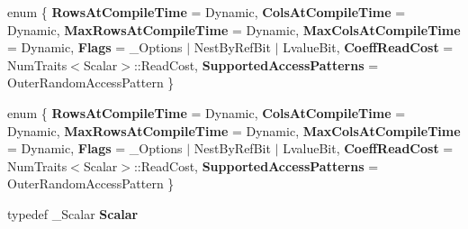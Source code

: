 \begin{DoxyCompactItemize}
\item 
\mbox{\label{struct_eigen_1_1internal_1_1traits_3_01_dynamic_sparse_matrix_3_01___scalar_00_01___options_00_01___storage_index_01_4_01_4_a776f5615686c280cbdfa6ea72b9144d2}} 
enum \{ \newline
{\bfseries Rows\+At\+Compile\+Time} = Dynamic, 
{\bfseries Cols\+At\+Compile\+Time} = Dynamic, 
{\bfseries Max\+Rows\+At\+Compile\+Time} = Dynamic, 
{\bfseries Max\+Cols\+At\+Compile\+Time} = Dynamic, 
\newline
{\bfseries Flags} = \+\_\+\+Options $\vert$ Nest\+By\+Ref\+Bit $\vert$ Lvalue\+Bit, 
{\bfseries Coeff\+Read\+Cost} = Num\+Traits$<$Scalar$>$\+:\+:Read\+Cost, 
{\bfseries Supported\+Access\+Patterns} = Outer\+Random\+Access\+Pattern
 \}
\item 
\mbox{\label{struct_eigen_1_1internal_1_1traits_3_01_dynamic_sparse_matrix_3_01___scalar_00_01___options_00_01___storage_index_01_4_01_4_a7a53718df49f5cbea4ab2f8ccf69bdc7}} 
enum \{ \newline
{\bfseries Rows\+At\+Compile\+Time} = Dynamic, 
{\bfseries Cols\+At\+Compile\+Time} = Dynamic, 
{\bfseries Max\+Rows\+At\+Compile\+Time} = Dynamic, 
{\bfseries Max\+Cols\+At\+Compile\+Time} = Dynamic, 
\newline
{\bfseries Flags} = \+\_\+\+Options $\vert$ Nest\+By\+Ref\+Bit $\vert$ Lvalue\+Bit, 
{\bfseries Coeff\+Read\+Cost} = Num\+Traits$<$Scalar$>$\+:\+:Read\+Cost, 
{\bfseries Supported\+Access\+Patterns} = Outer\+Random\+Access\+Pattern
 \}
\item 
\mbox{\label{struct_eigen_1_1internal_1_1traits_3_01_dynamic_sparse_matrix_3_01___scalar_00_01___options_00_01___storage_index_01_4_01_4_a31d8a8451110e6daf84c3cfb1b9f1001}} 
typedef \+\_\+\+Scalar {\bfseries Scalar}
\item 
\mbox{\label{struct_eigen_1_1internal_1_1traits_3_01_dynamic_sparse_matrix_3_01___scalar_00_01___options_00_01___storage_index_01_4_01_4_a0d2aefde5233aca4a11eca62686577c5}} 

\end{DoxyCompactItemize}
